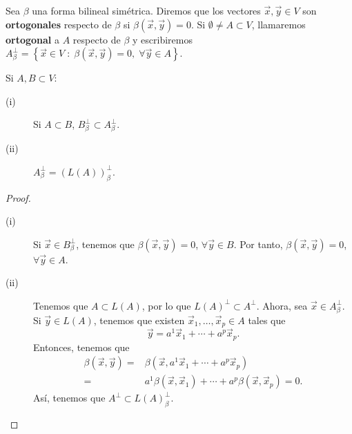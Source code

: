 \begin{fdefinition}[Ortogonal]
\normalfont Sea $\displaystyle \beta  $ una forma bilineal simétrica. Diremos que los vectores $\displaystyle \vec{x}, \vec{y} \in V $ son \textbf{ortogonales} respecto de $\displaystyle \beta  $ si $\displaystyle \beta\left(\vec{x}, \vec{y}\right) = 0 $. Si $\displaystyle \emptyset \neq A \subset V $, llamaremos \textbf{ortogonal} a $\displaystyle A $ respecto de $\displaystyle \beta  $ y escribiremos $\displaystyle A^{\perp }_{\beta } = \left\{ \vec{x} \in V \; : \; \beta\left(\vec{x}, \vec{y}\right) = 0, \; \forall \vec{y} \in A\right\}  $.
\end{fdefinition}
\begin{fprop}[]
\normalfont Si $\displaystyle A, B \subset V $:
\begin{description}
\item[(i)] Si $\displaystyle A \subset B $, $\displaystyle B_{\beta }^{\perp } \subset A^{\perp }_{\beta } $.
\item[(ii)] $\displaystyle A^{\perp }_{\beta } = \left(L\left(A\right)\right)^{\perp }_{\beta } $.
\end{description}
\end{fprop}
\begin{proof}
\begin{description}
\item[(i)] Si $\displaystyle \vec{x} \in B^{\perp }_{\beta} $, tenemos que $\displaystyle \beta\left(\vec{x}, \vec{y}\right) = 0 $, $\displaystyle \forall \vec{y}\in B $. Por tanto, $\displaystyle \beta\left(\vec{x}, \vec{y}\right) = 0 $, $\displaystyle \forall \vec{y} \in A $.
\item[(ii)] Tenemos que $\displaystyle A \subset L\left(A\right) $, por lo que $\displaystyle L\left(A\right)^{\perp } \subset A^{\perp } $. Ahora, sea $\displaystyle \vec{x} \in A^{\perp }_{\beta } $. Si $\displaystyle \vec{y} \in L\left(A\right) $, tenemos que existen $\displaystyle \vec{x}_{1}, \ldots, \vec{x}_{p} \in A $ tales que
	\[\vec{y} = a^{1}\vec{x}_{1} + \cdots + a^{p}\vec{x}_{p} .\]
Entonces, tenemos que 
\[
\begin{split}
	\beta\left(\vec{x}, \vec{y}\right) = & \beta\left(\vec{x}, a^{1}\vec{x}_{1} + \cdots + a^{p}\vec{x}_{p}\right)  \\
	= & a^{1}\beta\left(\vec{x}, \vec{x}_{1}\right) + \cdots + a^{p}\beta\left(\vec{x}, \vec{x}_{p}\right) = 0.
\end{split}
\]
Así, tenemos que $\displaystyle A^{\perp } \subset L\left(A\right)^{\perp }_{\beta } $.
\end{description}
\end{proof}
